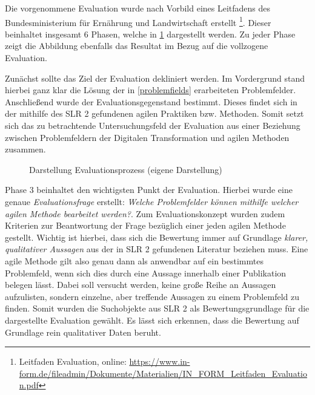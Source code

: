 Die vorgenommene Evaluation wurde nach Vorbild eines Leitfadens des Bundesministerium für Ernährung und Landwirtschaft erstellt \footnote{Leitfaden Evaluation, \newline online: \url{https://www.in-form.de/fileadmin/Dokumente/Materialien/IN_FORM_Leitfaden_Evaluation.pdf}}. Dieser beinhaltet insgesamt 6 Phasen, welche in \ref{fig:evaluation} dargestellt werden. Zu jeder Phase zeigt die Abbildung ebenfalls das Resultat im Bezug auf die  vollzogene Evaluation. 

Zunächst sollte das Ziel der Evaluation dekliniert werden. Im Vordergrund stand hierbei ganz klar die Lösung der in \ref{problemfields} erarbeiteten Problemfelder. Anschließend wurde der  Evaluationsgegenstand bestimmt. Dieses findet sich in der mithilfe des SLR 2 gefundenen agilen Praktiken bzw. Methoden. Somit setzt sich das zu betrachtende Untersuchungsfeld der Evaluation aus einer Beziehung zwischen Problemfeldern der Digitalen Transformation und agilen Methoden zusammen.

\begin{figure}[H]
	\centering
	\caption[Darstellung Evaluationsprozess]{Darstellung Evaluationsprozess (eigene Darstellung)}
	\label{fig:evaluation}
\end{figure}

Phase 3 beinhaltet den wichtigsten Punkt der Evaluation. Hierbei wurde eine genaue \textit{Evaluationsfrage} erstellt: \textit{Welche Problemfelder können mithilfe welcher agilen Methode bearbeitet werden?}. Zum Evaluationskonzept wurden zudem Kriterien zur Beantwortung der Frage bezüglich einer jeden agilen Methode gestellt. Wichtig ist hierbei, dass sich die Bewertung immer auf Grundlage \textit{klarer, qualitativer Aussagen} aus der in SLR 2 gefundenen Literatur beziehen muss. Eine agile Methode gilt also genau dann als anwendbar auf ein bestimmtes Problemfeld, wenn sich dies durch eine Aussage innerhalb einer Publikation belegen lässt. Dabei soll versucht werden, keine große Reihe an Aussagen aufzulisten, sondern einzelne, aber treffende Aussagen zu einem Problemfeld zu finden. Somit wurden die Suchobjekte aus SLR 2 als Bewertungsgrundlage für die dargestellte Evaluation gewählt.  Es lässt sich erkennen, dass die Bewertung auf Grundlage rein qualitativer Daten beruht.

